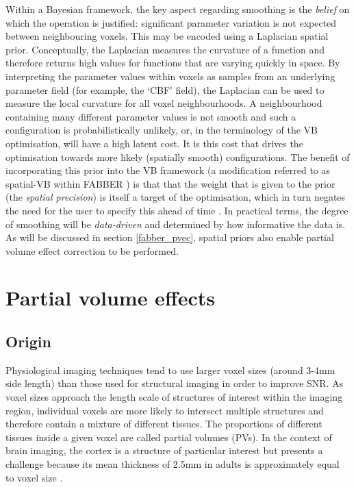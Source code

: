 Within a Bayesian framework, the key aspect regarding smoothing is the \textit{belief} on which the operation is justified: significant parameter variation is not expected between neighbouring voxels. This may be encoded using a Laplacian spatial prior. Conceptually, the Laplacian measures the curvature of a function and therefore returns high values for functions that are varying quickly in space. By interpreting the parameter values within voxels as samples from an underlying parameter field (for example, the `CBF' field), the Laplacian can be used to measure the local curvature for all voxel neighbourhoods. A neighbourhood containing many different parameter values is not smooth and such a configuration is probabilistically unlikely, or, in the terminology of the VB optimisation, will have a high latent cost. It is this cost that drives the optimisation towards more likely (spatially smooth) configurations. The benefit of incorporating this prior into the VB framework (a modification referred to as spatial-VB within FABBER \cite{Chappell2011}) is that that the weight that is given to the prior (the \textit{spatial precision}) is itself a target of the optimisation, which in turn negates the need for the user to specify this ahead of time \cite{Penny2005}. In practical terms, the degree of smoothing will be \textit{data-driven} and determined by how informative the data is. As will be discussed in section \ref{fabber_pvec}, spatial priors also enable partial volume effect correction to be performed. 


\section{Partial volume effects}

\subsection{Origin}

Physiological imaging techniques tend to use larger voxel sizes (around 3-4mm side length) than those used for structural imaging in order to improve SNR. As voxel sizes approach the length scale of structures of interest within the imaging region, individual voxels are more likely to intersect multiple structures and therefore contain a mixture of different tissues. The proportions of different tissues inside a given voxel are called partial volumes (PVs). In the context of brain imaging, the cortex is a structure of particular interest but presents a challenge because its mean thickness of 2.5mm in adults is approximately equal to voxel size \cite{Fischl1999a}.  

